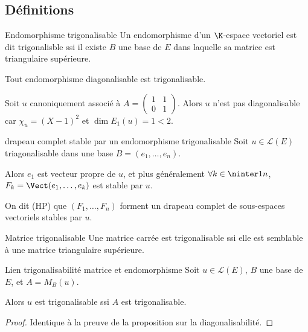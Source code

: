 \subsection{Définitions}

\begin{definition}{Endomorphisme trigonalisable}{}
    Un endomorphisme d'un $\K$-espace vectoriel est dit trigonalisble ssi il existe 
    $B$ une base de $E$ dans laquelle sa matrice est triangulaire supérieure.
\end{definition}

\begin{exemple}
    Tout endomorphisme diagonalisable est trigonalisable.

    Soit $u$ canoniquement associé à $A = \begin{pmatrix}
        1 & 1 \\
        0 & 1
    \end{pmatrix}$. Alors $u$ n'est pas diagonalisable car
    $\chi_u = (X - 1)^2$ et $\dim E_1(u) = 1 < 2$.
\end{exemple}

\begin{propositionnt}{drapeau complet stable par un endomorphisme trigonalisable}{}
    Soit $u \in \mathscr L(E)$ triagonalisable dans une base $B = (e_1, \ldots, e_n)$.

    Alors $e_1$ est vecteur propre de $u$, et plus généralement 
    $\forall k \in \ninter 1 n$, $F_k = \Vect(e_1, \ldots, e_k)$ est stable par $u$.

    On dit (HP) que $(F_1, \dots, F_n)$ forment un drapeau complet de sous-espaces vectoriels stables par $u$.
\end{propositionnt}

\begin{definition}{Matrice trigonalisable}{}
    Une matrice carrée est trigonalisable ssi elle est semblable à une matrice triangulaire supérieure.
\end{definition}

\begin{proposition}{Lien trigonalisabilité matrice et endomorphisme}{}
    Soit $u \in \mathscr L(E)$, $B$ une base de $E$, et $A = M_B(u)$.

    Alors $u$ est trigonalisable ssi $A$ est trigonalisable.
\end{proposition}

\begin{proof}
    Identique à la preuve de la proposition sur la diagonalisabilité.
\end{proof}

